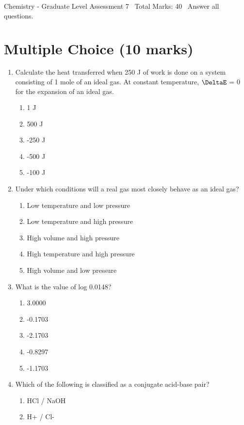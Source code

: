 \documentclass[12pt]{article}
\begin{document}
\begin{center}
Chemistry - Graduate Level Assessment 7 \
Total Marks: 40 \
Answer all questions.
\end{center}

\section*{Multiple Choice (10 marks)}
\begin{enumerate}[label=\arabic*.]
\item Calculate the heat transferred when 250 J of work is done on a system consisting of 1 mole of an ideal gas. At constant temperature, \ensuremath{\DeltaE} = 0 for the expansion of an ideal gas.
\begin{enumerate}[label=(\alph*)]
    \item 1 J
    \item 500 J
    \item -250 J
    \item -500 J
    \item -100 J
\end{enumerate}
\item Under which conditions will a real gas most closely behave as an ideal gas?
\begin{enumerate}[label=(\alph*)]
    \item Low temperature and low pressure
    \item Low temperature and high pressure
    \item High volume and high pressure
    \item High temperature and high pressure
    \item High volume and low pressure
\end{enumerate}
\item What is the value of log 0.0148?
\begin{enumerate}[label=(\alph*)]
    \item 3.0000
    \item -0.1703
    \item -2.1703
    \item -0.8297
    \item -1.1703
\end{enumerate}
\item Which of the following is classified as a conjugate acid-base pair?
\begin{enumerate}[label=(\alph*)]
    \item HCl / NaOH
    \item H+ / Cl-

\end{enumerate}
\end{enumerate}
\end{document}
